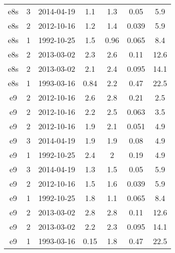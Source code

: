 \begin{longtable}[htp]
\begin{longtable}{ccccccc}
e8s & 3 & 2014-04-19 & 1.1 & 1.3 & 0.05 & 5.9 \\
e8s & 2 & 2012-10-16 & 1.2 & 1.4 & 0.039 & 5.9 \\
e8s & 1 & 1992-10-25 & 1.5 & 0.96 & 0.065 & 8.4 \\
e8s & 2 & 2013-03-02 & 2.3 & 2.6 & 0.11 & 12.6 \\
e8s & 2 & 2013-03-02 & 2.1 & 2.4 & 0.095 & 14.1 \\
e8s & 1 & 1993-03-16 & 0.84 & 2.2 & 0.47 & 22.5 \\
e9 & 2 & 2012-10-16 & 2.6 & 2.8 & 0.21 & 2.5 \\
e9 & 2 & 2012-10-16 & 2.2 & 2.5 & 0.063 & 3.5 \\
e9 & 2 & 2012-10-16 & 1.9 & 2.1 & 0.051 & 4.9 \\
e9 & 3 & 2014-04-19 & 1.9 & 1.9 & 0.08 & 4.9 \\
e9 & 1 & 1992-10-25 & 2.4 & 2 & 0.19 & 4.9 \\
e9 & 3 & 2014-04-19 & 1.3 & 1.5 & 0.05 & 5.9 \\
e9 & 2 & 2012-10-16 & 1.5 & 1.6 & 0.039 & 5.9 \\
e9 & 1 & 1992-10-25 & 1.8 & 1.1 & 0.065 & 8.4 \\
e9 & 2 & 2013-03-02 & 2.8 & 2.8 & 0.11 & 12.6 \\
e9 & 2 & 2013-03-02 & 2.2 & 2.3 & 0.095 & 14.1 \\
e9 & 1 & 1993-03-16 & 0.15 & 1.8 & 0.47 & 22.5 \\
\hline
\end{longtable}

\end{longtable}
